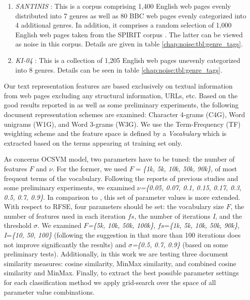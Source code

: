 \begin{enumerate}
	\item \textit{SANTINIS} \parencite{mehler2010genres_on_web}: This is a corpus comprising 1,400 English web pages evenly distributed into 7 genres as well as 80 BBC web pages evenly categorized into 4 additional genres. In addition, it comprises a random selection of 1,000 English web pages taken from the SPIRIT corpus \parencite{joho2004spirit}. The latter can be viewed as noise in this corpus. Details are given in table \ref{chap:noise:tbl:genre_tags}.
	\item \textit{KI-04} \parencite{meyer2004genre}: This is a collection of 1,205 English web pages unevenly categorized into 8 genres. Details can be seen in table \ref{chap:noise:tbl:genre_tags}.
\end{enumerate}


Our text representation features are based exclusively on textual information from web pages excluding any structural information, URLs, etc. Based on the good results reported in \parencite{sharoff2010web,pritsos2013open,Asheghi2015} as well as some preliminary experiments, the following document representation schemes are examined: Character 4-grams (C4G), Word unigrams (W1G), and Word 3-grams (W3G). We use the Term-Frequency (TF) weighting scheme  and the feature space is defined by a \textit{Vocabulary} which is extracted based on the terms appearing at training set only.

As concerns OCSVM model, two parameters have to be tuned: the number of features $F$ and $\nu$. For the former, we used $F=$\textit{\{1k, 5k, 10k, 50k, 90k\}}, of most frequent terms of the vocabulary. Following the reports of previous studies \parencite{scholkopf1999estimating} and some preliminary experiments, we examined $\nu$\textit{=\{0.05, 0.07, 0.1, 0.15, 0.17, 0.3, 0.5, 0.7, 0.9\}}. In comparison to \parencite{pritsos2013open}, this set of parameter values is more extended. With respect to RFSE, four parameters should be set: the vocabulary size $F$, the number of features used in each iteration $fs$, the number of iterations \textit{I}, and the threshold $\sigma$. We examined $F$\textit{=\{5k, 10k, 50k, 100k\}}, $fs$=\textit{\{1k, 5k, 10k, 50k, 90k\}}, \textit{I}=\textit{\{10, 50, 100\}} (following the suggestion in \parencite{koppel2011authorship} that more than 100 iterations does not improve significantly the results) and $\sigma$\textit{=\{0.5, 0.7, 0.9\}} (based on some preliminary tests). Additionally, in this work we are testing three document similarity measures: cosine similarity, MinMax similarity,  and combined cosine similarity and MinMax. Finally, to extract the best possible parameter settings for each classification method we apply grid-search over the space of all parameter value combinations.

